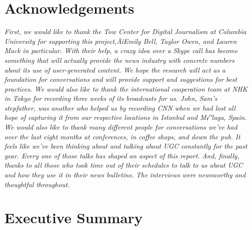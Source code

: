 \documentclass[symmetric, notoc, nobib]{towcenter-book}
\begin{document}
\cleardoublepage


\mainmatter

\chapter{Acknowledgements}
\textit{First, we would like to thank the Tow Center for Digital Journalism at Columbia University for supporting this project‚ÄîEmily Bell, Taylor Owen, and Lauren Mack in particular. With their help, a crazy idea over a Skype call has become something that will actually provide the news industry with concrete numbers about its use of user-generated content. We hope the research will act as a foundation for conversations and will provide support and suggestions for best practices. We would also like to thank the international cooperation team at NHK in Tokyo for recording three weeks of its broadcasts for us. John, Sam's stepfather, was another who helped us by recording CNN when we had lost all hope of capturing it from our respective locations in Istanbul and M√°laga, Spain. We would also like to thank many different people for conversations we've had over the last eight months at conferences, in coffee shops, and down the pub. It feels like we've been thinking about and talking about UGC constantly for the past year. Every one of those talks has shaped an aspect of this report. And, finally, thanks to all those who took time out of their schedules to talk to us about UGC and how they use it in their news bulletins. The interviews were newsworthy and thoughtful throughout.}

\chapter{Executive Summary}
\end{document}
